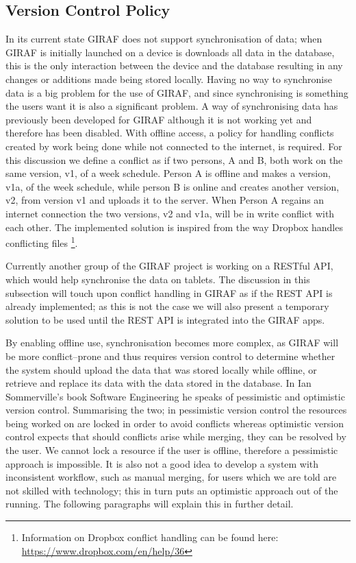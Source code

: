 \subsection{Version Control Policy}\label{ssec:policy}
In its current state GIRAF does not support synchronisation of data; when GIRAF is initially launched on a device is downloads all data in the database, this is the only interaction between the device and the database resulting in any changes or additions made being stored locally.
Having no way to synchronise data is a big problem for the use of GIRAF, and since synchronising is something the users want it is also a significant problem.
A way of synchronising data has previously been developed for GIRAF although it is not working yet and therefore has been disabled.
With offline access, a policy for handling conflicts created by work being done while not connected to the internet, is required.
For this discussion we define a conflict as if two persons, A and B, both work on the same version, v1, of a week schedule.
Person A is offline and makes a version, v1a, of the week schedule, while person B is online and creates another version, v2, from version v1 and uploads it to the server.
When Person A regains an internet connection the two versions, v2 and v1a, will be in write conflict with each other. 
The implemented solution is inspired from the way Dropbox handles conflicting files \footnote{Information on Dropbox conflict handling can be found here: \url{https://www.dropbox.com/en/help/36}}. 

\bigskip \noindent
Currently another group of the GIRAF project is working on a RESTful API, which would help synchronise the data on tablets.
The discussion in this subsection will touch upon conflict handling in GIRAF as if the REST API is already implemented; as this is not the case we will also present a temporary solution to be used until the REST API is integrated into the GIRAF apps.

By enabling offline use, synchronisation becomes more complex, as GIRAF will be more conflict--prone and thus requires version control to determine whether the system should upload the data that was stored locally while offline, or retrieve and replace its data with the data stored in the database.
In Ian Sommerville's book Software Engineering \citep{SEBOOK} he speaks of pessimistic and optimistic version control.
Summarising the two; in pessimistic version control the resources being worked on are locked in order to avoid conflicts whereas optimistic version control expects that should conflicts arise while merging, they can be resolved by the user.
We cannot lock a resource if the user is offline, therefore a pessimistic approach is impossible.
It is also not a good idea to develop a system with inconsistent workflow, such as manual merging, for users which we are told are not skilled with technology; this in turn puts an optimistic approach out of the running.
The following paragraphs will explain this in further detail.

